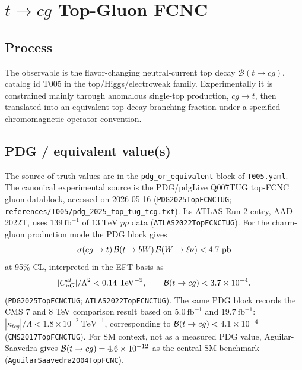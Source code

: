 
\section{\texorpdfstring{\(t\to c g\)}{t -> c g} Top-Gluon FCNC}

\subsection*{Process}
The observable is the flavor-changing neutral-current top decay
\(\mathcal{B}(t\to c g)\), catalog id T005 in the top/Higgs/electroweak
family.  Experimentally it is constrained mainly through anomalous single-top
production, \(c g\to t\), then translated into an equivalent top-decay
branching fraction under a specified chromomagnetic-operator convention.

\subsection*{PDG / equivalent value(s)}
The source-of-truth values are in the \texttt{pdg\_or\_equivalent} block of
\texttt{T005.yaml}.  The canonical experimental source is the PDG/pdgLive
Q007TUG top-FCNC gluon datablock, accessed on 2026-05-16
(\texttt{PDG2025TopFCNCTUG};
\texttt{references/T005/pdg\_2025\_top\_tug\_tcg.txt}).  Its ATLAS Run-2
entry, AAD 2022T, uses \(139~\mathrm{fb}^{-1}\) of \(13~\mathrm{TeV}\)
\(pp\) data (\texttt{ATLAS2022TopFCNCTUG}).  For the charm-gluon production
mode the PDG block gives
\[
  \sigma(cg\to t)\,{\cal B}(t\to bW)\,{\cal B}(W\to \ell\nu)<4.7~\mathrm{pb}
\]
at 95\% CL, interpreted in the EFT basis as
\[
  |C^{ct}_{uG}|/\Lambda^2 < 0.14~\mathrm{TeV}^{-2},
  \qquad
  {\cal B}(t\to c g)<3.7\times10^{-4}.
\]
(\texttt{PDG2025TopFCNCTUG}; \texttt{ATLAS2022TopFCNCTUG}).
The same PDG block records the CMS 7 and 8 TeV comparison result based on
\(5.0~\mathrm{fb}^{-1}\) and \(19.7~\mathrm{fb}^{-1}\):
\(|\kappa_{tcg}|/\Lambda<1.8\times10^{-2}~\mathrm{TeV}^{-1}\), corresponding to
\({\cal B}(t\to c g)<4.1\times10^{-4}\)
(\texttt{CMS2017TopFCNCTUG}).  For SM context, not as a measured PDG value,
Aguilar-Saavedra gives
\({\cal B}(t\to c g)=4.6\times10^{-12}\) as the central SM benchmark
(\texttt{AguilarSaavedra2004TopFCNC}).

